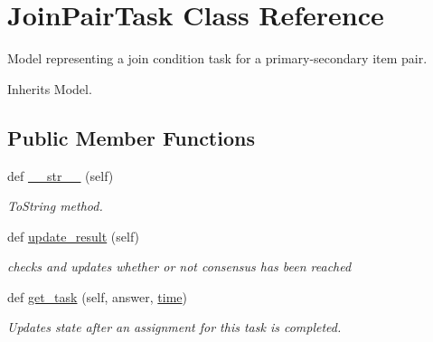 \hypertarget{classjoinapp_1_1models_1_1task__management__models_1_1_join_pair_task}{}\section{Join\+Pair\+Task Class Reference}
\label{classjoinapp_1_1models_1_1task__management__models_1_1_join_pair_task}


Model representing a join condition task for a primary-\/secondary item pair.  




Inherits Model.

\subsection*{Public Member Functions}
\begin{DoxyCompactItemize}
\item 
def \mbox{\hyperlink{classjoinapp_1_1models_1_1task__management__models_1_1_join_pair_task_a23e8041ce1015febe4fdace3225714f9}{\+\_\+\+\_\+str\+\_\+\+\_\+}} (self)
\begin{DoxyCompactList}\small\item\em To\+String method. \end{DoxyCompactList}\item 
def \mbox{\hyperlink{classjoinapp_1_1models_1_1task__management__models_1_1_join_pair_task_a9013f18300fef58695383b65dd3ad816}{update\+\_\+result}} (self)
\begin{DoxyCompactList}\small\item\em checks and updates whether or not consensus has been reached \end{DoxyCompactList}\item 
def \mbox{\hyperlink{classjoinapp_1_1models_1_1task__management__models_1_1_join_pair_task_a5c2eb6f87a32af834dd29469a6189f0c}{get\+\_\+task}} (self, answer, \mbox{\hyperlink{classjoinapp_1_1models_1_1task__management__models_1_1_join_pair_task_a70c092a6aebace0b1ea406e14da78a40}{time}})
\begin{DoxyCompactList}\small\item\em Updates state after an assignment for this task is completed. \end{DoxyCompactList}\end{DoxyCompactItemize}
